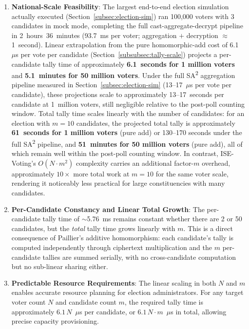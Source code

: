 \begin{enumerate}
    \item \textbf{National-Scale Feasibility}: The largest end-to-end election simulation actually executed (Section~\ref{subsec:election-sim}) ran 100{,}000 voters with 3 candidates in mock mode, completing the full cast-aggregate-decrypt pipeline in 2~hours~36~minutes (93.7~ms per voter; aggregation $+$ decryption $\approx$ 1~second). Linear extrapolation from the pure homomorphic-add cost of 6.1~$\mu$s per vote per candidate (Section~\ref{subsubsec:tally-scale}) projects a per-candidate tally time of approximately \textbf{6.1~seconds for 1 million voters} and \textbf{5.1~minutes for 50 million voters}. Under the full SA\textsuperscript{2} aggregation pipeline measured in Section~\ref{subsec:election-sim} (13--17~$\mu$s per vote per candidate), these projections scale to approximately 13--17~seconds per candidate at 1~million voters, still negligible relative to the post-poll counting window. Total tally time scales linearly with the number of candidates: for an election with $m=10$ candidates, the projected total tally is approximately \textbf{61~seconds for 1 million voters} (pure add) or 130--170 seconds under the full SA\textsuperscript{2} pipeline, and \textbf{51~minutes for 50 million voters} (pure add), all of which remain well within the post-poll counting window. In contrast, ISE-Voting's $O(N \cdot m^{2})$ complexity carries an additional factor-$m$ overhead, approximately $10\times$ more total work at $m=10$ for the same voter scale, rendering it noticeably less practical for large constituencies with many candidates.

    \item \textbf{Per-Candidate Constancy and Linear Total Growth}: The per-candidate tally time of $\sim$5.76~ms remains constant whether there are 2 or 50 candidates, but the \emph{total} tally time grows linearly with $m$. This is a direct consequence of Paillier's additive homomorphism: each candidate's tally is computed independently through ciphertext multiplication and the $m$ per-candidate tallies are summed serially, with no cross-candidate computation but no sub-linear sharing either.

    \item \textbf{Predictable Resource Requirements}: The linear scaling in both $N$ and $m$ enables accurate resource planning for election administrators. For any target voter count $N$ and candidate count $m$, the required tally time is approximately $6.1\,N$~$\mu$s per candidate, or $6.1\,N \cdot m$~$\mu$s in total, allowing precise capacity provisioning.
\end{enumerate}

